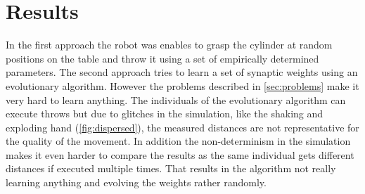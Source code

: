 \section{Results}
\label{sec:results}
In the first approach the robot was enables to grasp the cylinder at random positions on the table and throw it using a set of empirically determined parameters.
The second approach tries to learn a set of synaptic weights using an evolutionary algorithm.
However the problems described in \autoref{sec:problems} make it very hard to learn anything.
The individuals of the evolutionary algorithm can execute throws but due to glitches in the simulation, like the shaking and exploding hand (\autoref{fig:dispersed}), the measured distances are not representative for the quality of the movement.
In addition the non-determinism in the simulation makes it even harder to compare the results as the same individual gets different distances if executed multiple times.
That results in the algorithm not really learning anything and evolving the weights rather randomly.
